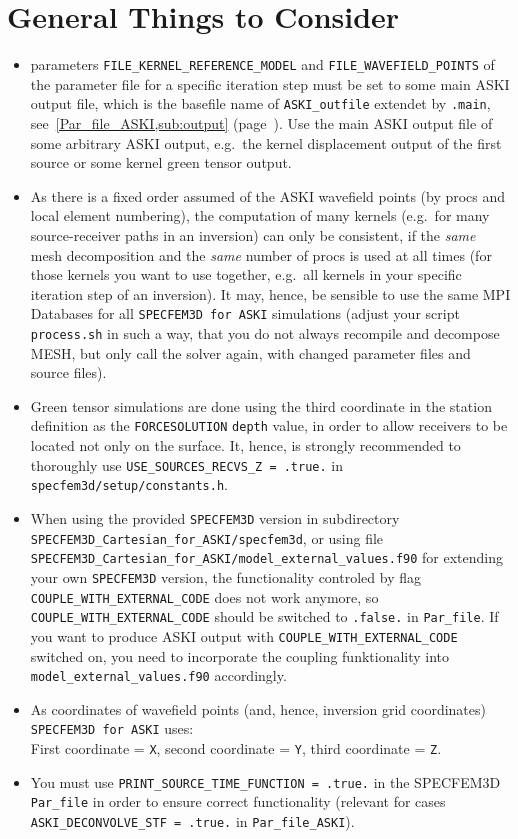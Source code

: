 \documentclass[12pt,a4paper]{article}
\newcommand{\lcode}[1]{\nolinkurl{#1}}
\newcommand{\ASKI}{ {\ttfamily ASKI} }
\newcommand{\myref}[1]{\ref{#1} (page~\pageref{#1})}
\begin{document}
\section{General Things to Consider} \label{general_stuff}
%
\begin{itemize}
\item parameters \lcode{FILE_KERNEL_REFERENCE_MODEL} and \lcode{FILE_WAVEFIELD_POINTS} 
  of the parameter file for a specific iteration step must be set to some main \ASKI{} output file,
  which is the basefile name of \lcode{ASKI_outfile} extendet by \lcode{.main}, see~\myref{Par_file_ASKI,sub:output}.
  Use the main \ASKI{} output file of some arbitrary \ASKI{} output, e.g.\ the kernel displacement output of the first source
  or some kernel green tensor output.
\item As there is a fixed order assumed of the \ASKI{} wavefield points (by procs and local element numbering), the 
  computation of many kernels (e.g.\ for many source-receiver paths in an inversion) can only be consistent, if the 
  \emph{same} mesh decomposition and the \emph{same} number of procs is used at all times 
  (for those kernels you want to use together, e.g.\ all kernels in your specific iteration step of an inversion).
  It may, hence, be sensible to use the same MPI Databases for all \lcode{SPECFEM3D for ASKI} simulations (adjust your 
  script \lcode{process.sh} in such a way, that you do not always recompile and decompose MESH, but only call the solver
  again, with changed parameter files and source files).
\item Green tensor simulations are done using the third coordinate in the station definition as the 
  \lcode{FORCESOLUTION} \lcode{depth} value, in order to allow receivers to be located not only on the surface.
  It, hence, is strongly recommended to thoroughly use \lcode{USE_SOURCES_RECVS_Z = .true.} in \lcode{specfem3d/setup/constants.h}.
\item When using the provided \lcode{SPECFEM3D} version in subdirectory \lcode{SPECFEM3D_Cartesian_for_ASKI/specfem3d},
  or using file \lcode{SPECFEM3D_Cartesian_for_ASKI/model_external_values.f90} for extending your own \lcode{SPECFEM3D} 
  version, the functionality controled by 
  flag \lcode{COUPLE_WITH_EXTERNAL_CODE} does not work anymore, so \lcode{COUPLE_WITH_EXTERNAL_CODE} should be switched
  to \lcode{.false.} in \lcode{Par_file}. If you want to produce \ASKI{} output with \lcode{COUPLE_WITH_EXTERNAL_CODE}
  switched on, you need to incorporate the coupling funktionality into \lcode{model_external_values.f90} accordingly.
\item As coordinates of wavefield points (and, hence, inversion grid coordinates) \\
  \lcode{SPECFEM3D for ASKI} uses:\\
  First coordinate = \lcode{X}, second coordinate = \lcode{Y}, third coordinate = \lcode{Z}.
\item You must use \lcode{PRINT_SOURCE_TIME_FUNCTION = .true.} in the SPECFEM3D \lcode{Par_file} in order to ensure correct
  functionality (relevant for cases \lcode{ASKI_DECONVOLVE_STF = .true.} in \lcode{Par_file_ASKI}).
\end{itemize}
\end{document}
